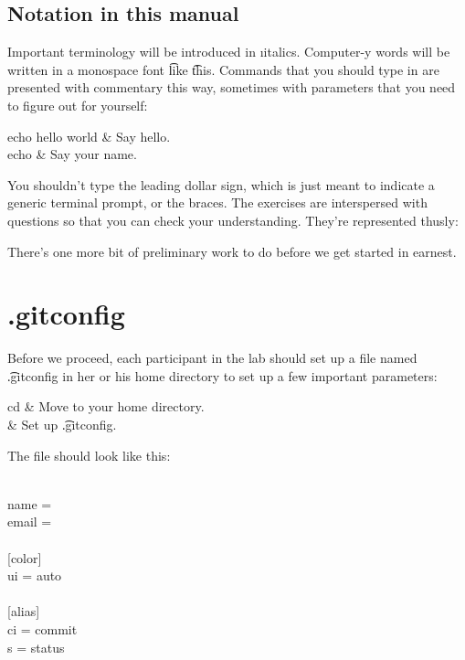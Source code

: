 \documentclass[letterpaper,12pt,titlepage,twoside]{article}
\begin{document}
\subsection*{Notation in this manual}

Important terminology will be introduced in \i{italics}. Computer-y words will
be written in a monospace font \t{like} \t{this}. Commands that you should
type in are presented with commentary this way, sometimes with parameters that
you need to figure out for yourself:

\begin{typeme}
echo hello world & Say hello. \\
echo  & Say your name.
\end{typeme}

You shouldn't type the leading dollar sign, which is just meant to indicate a
generic terminal prompt, or the braces. The exercises are interspersed with
questions so that you can check your understanding. They're represented
thusly:


There's one more bit of preliminary work to do before we get started in
earnest.


\section{.gitconfig}

Before we proceed, each participant in the lab should set up a file named
\t{.gitconfig} in her or his home directory to set up a few important
parameters:

\begin{typeme}
cd & Move to your home directory. \\
 & Set up \t{.gitconfig}.
\end{typeme}

The file should look like this:

\begin{adjustwidth}{2.5em}{0pt}
\ttfamily
[user]\\
name = \\
email = \\
\\{}
[color]\\
ui = auto\\
\\{}
[alias]\\
ci = commit\\
s = status
\end{adjustwidth}
\end{document}
